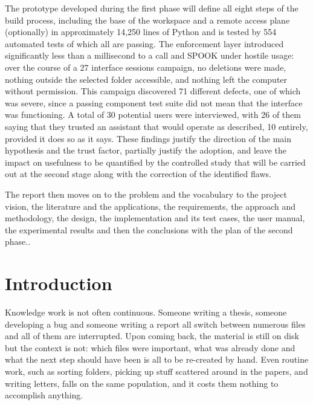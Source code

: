 \documentclass{FastFyp}
\begin{document}
The prototype developed during the first phase will define all eight steps of the build process, including the base of the workspace and a remote access plane (optionally) in approximately 14,250 lines of Python and is tested by 554 automated tests of which all are passing. The enforcement layer introduced significantly less than a millisecond to a call and SPOOK under hostile usage: over the course of a 27 interface sessions campaign, no deletions were made, nothing outside the selected folder accessible, and nothing left the computer without permission. This campaign discovered 71 different defects, one of which was severe, since a passing component test suite did not mean that the interface was functioning. A total of 30 potential users were interviewed, with 26 of them saying that they trusted an assistant that would operate as described, 10 entirely, provided it does so as it says. These findings justify the direction of the main hypothesis and the trust factor, partially justify the adoption, and leave the impact on usefulness to be quantified by the controlled study that will be carried out at the second stage along with the correction of the identified flaws.

The report then moves on to the problem and the vocabulary to the project vision, the literature and the applications, the requirements, the approach and methodology, the design, the implementation and its test cases, the user manual, the experimental results and then the conclusions with the plan of the second phase..
\pagebreak

\pagestyle{fancy}
\tableofcontents

\pagebreak
\listoffigures
{}
\pagebreak
\listoftables
{}

\mainmatter


\chapter{Introduction}
Knowledge work is not often continuous. Someone writing a thesis, someone developing a bug and someone writing a report all switch between numerous files and all of them are interrupted. Upon coming back, the material is still on disk but the context is not: which files were important, what was already done and what the next step should have been is all to be re-created by hand. Even routine work, such as sorting folders, picking up stuff scattered around in the papers, and writing letters, falls on the same population, and it costs them nothing to accomplish anything.
\end{document}
